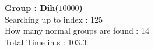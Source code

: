 \textbf{Group : Dih($10000$)}\\
Searching up to index : 125\\
How many normal groups are found : 14\\
Total Time in s : 103.3\\
